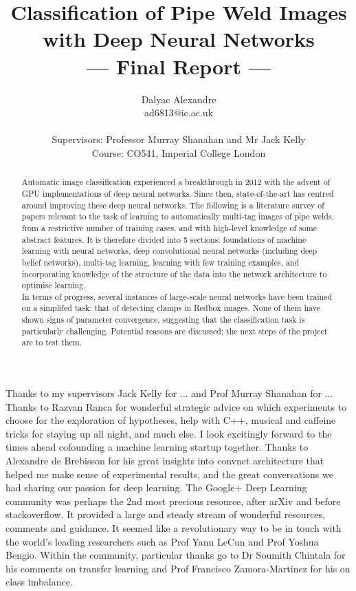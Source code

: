 \documentclass[a4paper,11pt]{article}
\title{Classification of Pipe Weld Images with Deep Neural Networks\\\Large{--- Final Report ---}}
\author{Dalyac Alexandre\\
       ad6813@ic.ac.uk\\ \\
       \small{Supervisors: Professor Murray Shanahan and Mr Jack Kelly}\\
       \small{Course: CO541, Imperial College London}
}
\begin{document}
\maketitle

\begin{abstract}

{
Automatic image classification experienced a breakthrough in 2012 with the advent of GPU implementations of deep neural networks. Since then, state-of-the-art has centred around improving these deep neural networks. The following is a literature survey of papers relevant to the task of learning to automatically multi-tag images of pipe welds, from a restrictive number of training cases, and with high-level knowledge of some abstract features. It is therefore divided into 5 sections: foundations of machine learning with neural networks, deep convolutional neural networks (including deep belief networks), multi-tag learning, learning with few training examples, and incorporating knowledge of the structure of the data into the network architecture to optimise learning.\\

In terms of progress, several instances of large-scale neural networks have been trained on a simplifed task: that of detecting clamps in Redbox images. None of them have shown signs of parameter convergence, suggesting that the classification task is particularly challenging. Potential reasons are discussed; the next steps of the project are to test them.
}
\end{abstract}

\clearpage
\tableofcontents

\clearpage

Thanks to my supervisors Jack Kelly for ... and Prof Murray Shanahan for ...
Thanks to Razvan Ranca for wonderful strategic advice on which experiments to choose for the exploration of hypotheses, help with C++, musical and caffeine tricks for staying up all night, and much else. I look excitingly forward to the times ahead cofounding a machine learning startup together.
Thanks to Alexandre de Brebisson for his great insights into convnet architecture that helped me make sense of experimental results, and the great conversations we had sharing our passion for deep learning.
The Google+ Deep Learning community was perhaps the 2nd most precious resource, after arXiv and before stackoverflow. It provided a large and steady stream of wonderful resources, comments and guidance. It seemed like a revolutionary way to be in touch with the world's leading researchers such as Prof Yann LeCun and Prof Yoshua Bengio. Within the community, particular thanks go to Dr Soumith Chintala for his comments on transfer learning and Prof Francisco Zamora-Martinez for his on class imbalance.
\end{document}
